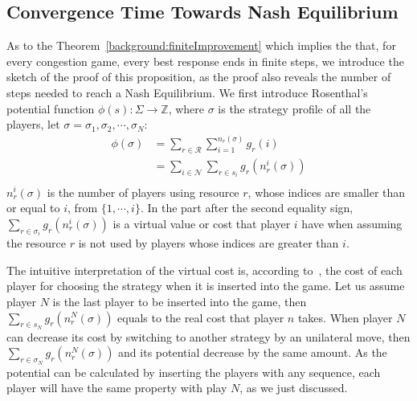 \subsection{Convergence Time Towards Nash Equilibrium}
As to the Theorem~\ref{background:finiteImprovement} which implies the that, for every congestion game, every best response ends in finite steps, we introduce the sketch of the proof of this proposition, as the proof also reveals the number of steps needed to reach a Nash Equilibrium.
We first introduce Rosenthal's potential function $\phi(s):\Sigma\rightarrow \mathbb{Z}$, where $\sigma$ is the strategy profile of all the players, let $\sigma = \sigma_1, \sigma_2,\cdots, \sigma_N$:
\begin{equation}
\label{2:Rosenthal_potential}
\begin{split}
\phi(\sigma) 
& =\sum\limits^{}_{r\in \mathcal{R}} \sum\limits^{n_r(\sigma)}_{i=1} g_r(i)\\
& =\sum\limits_{i\in \mathcal{N}} \sum\limits^{}_{r\in s_i} g_r(n_r^i(\sigma))\\
\end{split}
\end{equation}
$n_r^i(\sigma)$ is the number of players using resource $r$, whose indices are smaller than or equal to $i$, \ie from $\{1,\cdots,i\}$. 
In the part after the second equality sign, $\sum\limits^{}_{r\in \sigma_i} g_r(n_r^i(\sigma))$ is a virtual value or cost that player $i$ have when assuming the resource $r$ is not used by players whose indices are greater than $i$.

The intuitive interpretation of the virtual cost is, according to~\cite{Voecking06congestiongames}, the cost of each player for choosing the strategy when it is inserted into the game.
Let us assume player $N$ is the last player to be inserted into the game, then $\sum\limits^{}_{r\in s_N} g_r(n_r^N(\sigma))$ equals to the real cost that player $n$ takes.
When player $N$ can decrease its cost by switching to another strategy by an unilateral move, then $\sum\limits^{}_{r\in \sigma_N} g_r(n_r^N(\sigma))$ and its potential decrease by the same amount.
As the potential can be calculated by inserting the players with any sequence, each player will have the same property with play $N$, as we just discussed.

